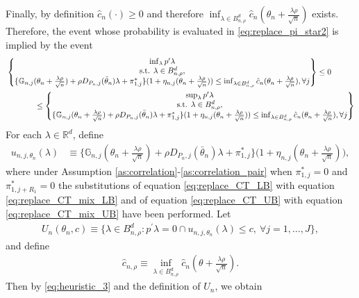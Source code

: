 \documentclass[letterpaper,11pt]{article}
\theoremstyle{myplain}
\theoremstyle{mydefinition}
\theoremstyle{myremark}
\newcommand{\R}{\mathbb{R}}
\newcommand{\larhon}{\frac{\lambda \rho }{\sqrt n}}
\newcommand{\tlarhon}{\tfrac{\lambda \rho }{\sqrt n}}
\numberwithin{equation}{section}
\numberwithin{figure}{section}
\begin{document}
\begin{appendices}
Finally, by definition $\hat{c}_n(\cdot) \ge 0$ and therefore $\inf_{\lambda \in B^d_{n,\rho}}\hat{c}_n(\theta_n+\larhon)$ exists. Therefore, the event whose probability is evaluated in \eqref{eq:replace_pi_star2} is implied by the event
\begin{align}
&\begin{Bmatrix} \inf_{\lambda} p^\prime\lambda     \\ \text{s.t. } \lambda\in B^d_{n,\rho},  \\ \{\mathbb G_{n,j}(\theta_n+\larhon)+\rho D_{P_n,j}(\bar\theta_n)\lambda+\pi_{1,j}^*\}(1+\eta_{n,j}(\theta_n+\larhon))\le  \inf_{\lambda \in B^d_{n,\rho}}\hat{c}_n(\theta_n+\larhon), \forall j    \end{Bmatrix} \leq 0  \notag\\
	 &\hspace{0.5in}\leq\begin{Bmatrix} \sup_{\lambda} p'\lambda     \\ \text{s.t. } \lambda\in B^d_{n,\rho},  \\ \{\mathbb G_{n,j}(\theta_n+\larhon)+\rho D_{P_n,j}(\bar\theta_n)\lambda+\pi_{1,j}^*\}(1+\eta_{n,j}(\theta_n+\larhon))\le \inf_{\lambda \in B^d_{n,\rho}}\hat{c}_n(\theta_n+\larhon), \forall j    \end{Bmatrix}
	 \label{eq:heuristic_3}
\end{align}
For each $\lambda\in\R^d$, define
\begin{align}
u_{n,j,\theta_n}(\lambda)&\equiv	\bigl\{\mathbb G_{n,j}(\theta_n+\tfrac{\lambda \rho}{\sqrt{n}})+\rho D_{P_n,j}(\bar{\theta}_n)\lambda+\pi^*_{1,j}\bigr\}\bigr(1+\eta_{n,j}(\theta_n+\tfrac{\lambda \rho}{\sqrt{n}})\bigl),\label{eq:uj}
\end{align}
where under Assumption \ref{as:correlation}-\ref{as:correlation_pair} when $\pi_{1,j}^*=0$ and $\pi_{1,j+R_1}^*=0$ the substitutions of equation \eqref{eq:replace_CT_LB} with equation \eqref{eq:replace_CT_mix_LB} and of equation \eqref{eq:replace_CT_UB} with equation \eqref{eq:replace_CT_mix_UB} have been performed. Let 
\begin{align}
U_n(\theta_n,c)\equiv	\big\{\lambda\in B^d_{n,\rho}: p^\prime \lambda = 0 \cap u_{n,j,\theta_n}(\lambda)\le c, \: \forall j=1,\dots,J\big\}, \label{eq:set_U_NL}
\end{align}
and define 
 \begin{align}
\hat c_{n,\rho} \equiv \inf_{\lambda \in B^d_{n,\rho}} \hat{c}_n(\theta+\tlarhon). \label{eq:c*}
 \end{align}
Then by \eqref{eq:heuristic_3} and the definition of $U_n$, we obtain

\end{appendices}
\end{document}
